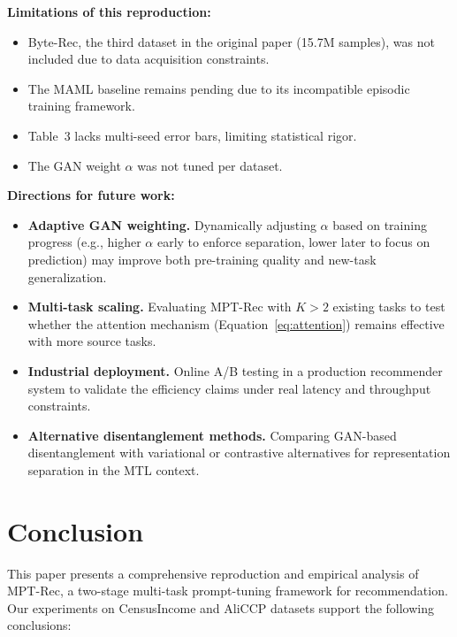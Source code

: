 \documentclass[review,anonymous]{acmart}
\begin{document}
\textbf{Limitations of this reproduction:}
\begin{itemize}
  \item Byte-Rec, the third dataset in the original paper (15.7M samples), was
    not included due to data acquisition constraints.
  \item The MAML baseline remains pending due to its incompatible episodic
    training framework.
  \item Table~3 lacks multi-seed error bars, limiting statistical rigor.
  \item The GAN weight $\alpha$ was not tuned per dataset.
\end{itemize}

\textbf{Directions for future work:}
\begin{itemize}
  \item \textbf{Adaptive GAN weighting.} Dynamically adjusting $\alpha$ based on
    training progress (e.g., higher $\alpha$ early to enforce separation, lower
    later to focus on prediction) may improve both pre-training quality and
    new-task generalization.
  \item \textbf{Multi-task scaling.} Evaluating MPT-Rec with $K > 2$ existing
    tasks to test whether the attention mechanism (Equation~\ref{eq:attention})
    remains effective with more source tasks.
  \item \textbf{Industrial deployment.} Online A/B testing in a production
    recommender system to validate the efficiency claims under real latency and
    throughput constraints.
  \item \textbf{Alternative disentanglement methods.} Comparing GAN-based
    disentanglement with variational or contrastive alternatives for
    representation separation in the MTL context.
\end{itemize}

\section{Conclusion}
\label{sec:conclusion}

This paper presents a comprehensive reproduction and empirical analysis of
MPT-Rec, a two-stage multi-task prompt-tuning framework for recommendation. Our
experiments on CensusIncome and AliCCP datasets support the following
conclusions:
\end{document}
